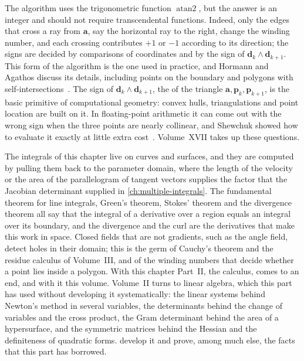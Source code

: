 The algorithm uses the trigonometric function $\operatorname{atan2}$, but the answer is an integer and should not require transcendental functions. Indeed, only the edges that cross a ray from $\mathbf a$, say the horizontal ray to the right, change the winding number, and each crossing contributes $+1$ or $-1$ according to its direction; the signs are decided by comparisons of coordinates and by the sign of $\mathbf d_k\wedge\mathbf d_{k+1}$. This  form of the algorithm is the one used in practice, and Hormann and Agathos discuss its details, including points on the boundary and polygons with self-intersections~\cite{hormann2001}. The sign of $\mathbf d_k\wedge\mathbf d_{k+1}$, the  of the triangle $\mathbf a,\mathbf p_k,\mathbf p_{k+1}$, is the basic primitive of computational geometry: convex hulls, triangulations and point location are built on it. In floating-point arithmetic it can come out with the wrong sign when the three points are nearly collinear, and Shewchuk showed how to evaluate it exactly at little extra cost~\cite{shewchuk1997}. Volume~XVII takes up these questions.

\bigskip
The integrals of this chapter live on curves and surfaces, and they are computed by pulling them back to the parameter domain, where the length of the velocity or the area of the parallelogram of tangent vectors supplies the factor that the Jacobian determinant supplied in \cref{ch:multiple-integrals}. The fundamental theorem for line integrals, Green's theorem, Stokes' theorem and the divergence theorem all say that the integral of a derivative over a region equals an integral over its boundary, and the divergence and the curl are the derivatives that make this work in space. Closed fields that are not gradients, such as the angle field, detect holes in their domain; this is the germ of Cauchy's theorem and the residue calculus of Volume~III, and of the winding numbers that decide whether a point lies inside a polygon. With this chapter Part~II, the calculus, comes to an end, and with it this volume. Volume~II turns to linear algebra, which this part has used without developing it systematically: the linear systems behind Newton's method in several variables, the determinants behind the change of variables and the cross product, the Gram determinant behind the area of a hypersurface, and the symmetric matrices behind the Hessian and the definiteness of quadratic forms.  develop it and prove, among much else, the facts that this part has borrowed.

